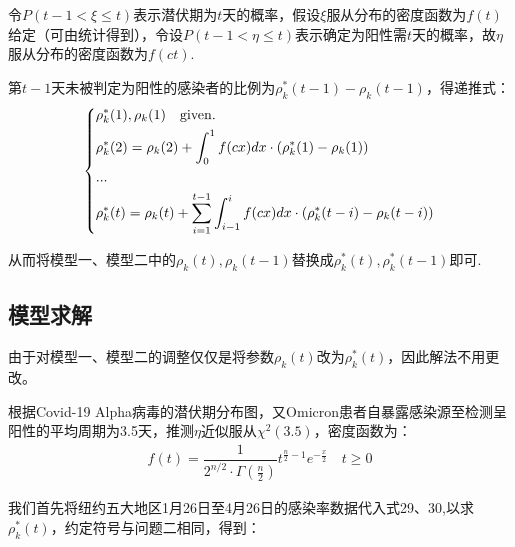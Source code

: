\documentclass[withoutpreface,bwprint]{cumcmthesis} %
\begin{document}
令$P(t-1<\xi \leqslant t)$表示潜伏期为$t$天的概率，假设$\xi$服从分布的密度函数为$f(t)$给定（可由统计得到），令设$P(t-1< \eta \leqslant t)$表示确定为阳性需$t$天的概率，故$\eta$服从分布的密度函数为$f(ct)$.

第$t-1$天未被判定为阳性的感染者的比例为$\rho^*_k(t-1)-\rho_k(t-1)$，得递推式：
\begin{align}
\left\{
\begin{aligned}
    & \rho^*_k(1),\rho_k(1)\quad {\rm given.}\\
    & \rho^*_k(2) =\rho_k(2) +\int^1_0 f(cx)dx\cdot \left(\rho^*_k(1)-\rho_k(1) \right)   \\
    & ...  \\
    & \rho^*_k(t) =\rho_k(t) + \sum^{t-1}_{i=1} \int^i_{i-1} f(cx)dx \cdot \left(\rho^*_k(t-i)-\rho_k(t-i) \right) 
\end{aligned}
 \right.  
\end{align}

从而将模型一、模型二中的$\rho_k(t),\rho_k(t-1)$替换成$\rho^*_k(t),\rho^*_k(t-1)$即可.

\subsection{模型求解}
由于对模型一、模型二的调整仅仅是将参数$\rho_k(t)$改为$\rho^*_k(t)$，因此解法不用更改。

根据Covid-19 Alpha病毒的潜伏期分布图\cite{5}，又Omicron患者自暴露感染源至检测呈阳性的平均周期为3.5天，推测$\eta$近似服从$ \chi^2  \left(3.5\right)$，密度函数为：
\begin{align}
    f(t)= \dfrac{1}{2^{n/2}\cdot \Gamma \left(\frac{n}{2} \right)}t^{\frac{n}{2}-1}e^{-\frac{x}{2}} \quad t\geqslant0 
\end{align}

我们首先将纽约五大地区1月26日至4月26日的感染率数据代入式29、30,以求$\rho^*_k(t)$，约定符号与问题二相同，得到：
\end{document}
